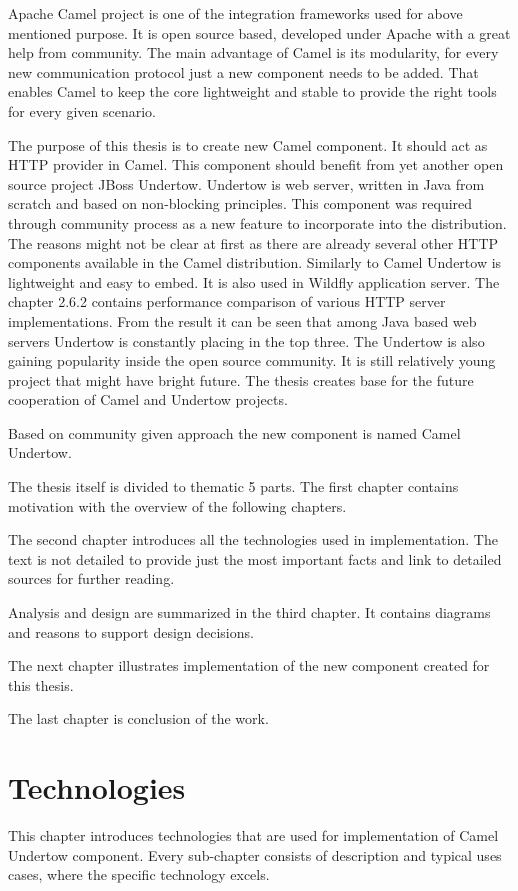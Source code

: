 \documentclass[12pt,final,oneside]{fithesis2}
\begin{document}
Apache Camel project is one of the integration frameworks used for above mentioned purpose. It is open source based, developed under Apache with a great help from community. The main advantage of Camel is its modularity, for every new communication protocol just a new component needs to be added. That enables Camel to keep the core lightweight and stable to provide the right tools for every given scenario.

 The purpose of this thesis is to create new Camel  component. It should act as HTTP provider in Camel. This component should benefit from yet another open source project JBoss Undertow. Undertow is web server, written in Java from scratch and based on non-blocking principles. This component was required through community process as a new feature to incorporate into the distribution. The reasons might not be clear at first as there are already several other HTTP components available in the Camel distribution. Similarly to Camel Undertow is lightweight and easy to embed. It is also used in Wildfly application server. The chapter 2.6.2 contains performance comparison of various HTTP server implementations. From the result it can be seen that among Java based web servers Undertow is constantly placing in the top three. The Undertow is also gaining popularity inside the open source community. It is still relatively young project that might have bright future. The thesis creates base for the future cooperation of Camel and Undertow projects.   
 
Based on community given approach the new component is named Camel Undertow.   
 
 The thesis itself is divided to thematic 5 parts. The first chapter contains motivation with the overview of the following chapters.
 
 The second chapter introduces all the technologies used in implementation. The text is not detailed to provide just the most important facts and link to detailed sources for further reading.

Analysis and design are summarized in the third chapter. It contains diagrams and reasons to support design decisions.

The next chapter illustrates implementation of the new component created for this thesis.

The last chapter is conclusion of the work.

\chapter{Technologies}
This chapter introduces technologies that are used for implementation of Camel Undertow component. Every sub-chapter consists of description and typical uses cases, where the specific technology excels.
\end{document}
